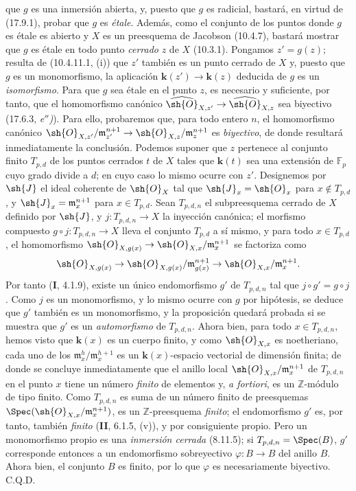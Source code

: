 que $g$ es una inmersión abierta, y, puesto que $g$ es radicial, bastará, en virtud de (17.9.1), probar que $g$ es \emph{étale}. Además, como el conjunto de los puntos donde $g$ es étale es abierto y $X$ es un preesquema de Jacobson (10.4.7), bastará mostrar que $g$ es étale en todo punto \emph{cerrado} $z$ de $X$ (10.3.1). Pongamos $z'=g(z)$; resulta de (10.4.11.1, (i)) que $z'$ también es un punto cerrado de $X$ y, puesto que $g$ es un monomorfismo, la aplicación $\boldsymbol{k}(z')\to\boldsymbol{k}(z)$ deducida de $g$ es un \emph{isomorfismo}. Para que $g$ sea étale en el punto $z$, es necesario y suficiente, por tanto, que el homomorfismo canónico $\widehat{\sh{O}}_{X,z'}\to\widehat{\sh{O}}_{X,z}$ sea biyectivo (17.6.3, \emph{e$''$)}). Para ello, probaremos que, para todo entero $n$, el homomorfismo canónico $\sh{O}_{X,z'}/\mathfrak m_{z'}^{n+1}\to\sh{O}_{X,z}/\mathfrak m_z^{n+1}$ es \emph{biyectivo}, de donde resultará inmediatamente la conclusión. Podemos suponer que $z$ pertenece al conjunto finito $T_{p,d}$ de los puntos cerrados $t$ de $X$ tales que $\boldsymbol k(t)$ sea una extensión de $\mathbb{F}_p$ cuyo grado divide a $d$; en cuyo caso lo mismo ocurre con $z'$. Designemos por $\sh{J}$ el ideal coherente de $\sh{O}_X$ tal que $\sh{J}_x=\sh{O}_x$ para $x\notin T_{p,d}$, y $\sh{J}_x=\mathfrak m_x^{n+1}$ para $x\in T_{p,d}$. Sean $T_{p,d,n}$ el subpreesquema cerrado de $X$ definido por $\sh{J}$, y $j:T_{p,d,n}\to X$ la inyección canónica; el morfismo compuesto $g\circ j:T_{p,d,n}\to X$ lleva el conjunto $T_{p,d}$ a sí mismo, y para todo $x\in T_{p,d}$, el homomorfismo $\sh{O}_{X,g(x)}\to\sh{O}_{X,x}/\mathfrak m_x^{n+1}$ se factoriza como
\[
\sh{O}_{X,g(x)}\to\sh{O}_{X,g(x)}/\mathfrak m_{g(x)}^{n+1}\to\sh{O}_{X,x}/\mathfrak m_x^{n+1}.
\]
Por tanto (\textbf{I}, 4.1.9), existe un único endomorfismo $g'$ de $T_{p,d,n}$ tal que $j\circ g'=g\circ j$. Como $j$ es un monomorfismo, y lo mismo ocurre con $g$ por hipótesis, se deduce que $g'$ también es un monomorfismo, y la proposición quedará probada si se muestra que $g'$ es un \emph{automorfismo} de $T_{p,d,n}$. Ahora bien, para todo $x\in T_{p,d,n}$, hemos visto que $\boldsymbol k(x)$ es un cuerpo finito, y como $\sh{O}_{X,x}$ es noetheriano, cada uno de los $\mathfrak m_x^h/\mathfrak m_x^{h+1}$ es un $\boldsymbol k(x)$-espacio vectorial de dimensión finita; de donde se concluye inmediatamente que el anillo local $\sh{O}_{X,x}/\mathfrak m_x^{n+1}$ de $T_{p,d,n}$ en el punto $x$ tiene un número \emph{finito} de elementos y, \emph{a fortiori}, es un $\mathbb{Z}$-módulo de tipo finito. Como $T_{p,d,n}$ es suma de un número finito de preesquemas $\Spec(\sh{O}_{X,x}/\mathfrak m_x^{n+1})$, es un $\mathbb{Z}$-preesquema \emph{finito}; el endomorfismo $g'$ es, por tanto, también \emph{finito} (\textbf{II}, 6.1.5, (v)), y por consiguiente propio. Pero un monomorfismo propio es una \emph{inmersión cerrada} (8.11.5); si $T_{p,d,n}=\Spec(B)$, $g'$ corresponde entonces a un endomorfismo sobreyectivo $\varphi:B\to B$ del anillo $B$. Ahora bien, el conjunto $B$ es finito, por lo que $\varphi$ es necesariamente biyectivo. C.Q.D.
